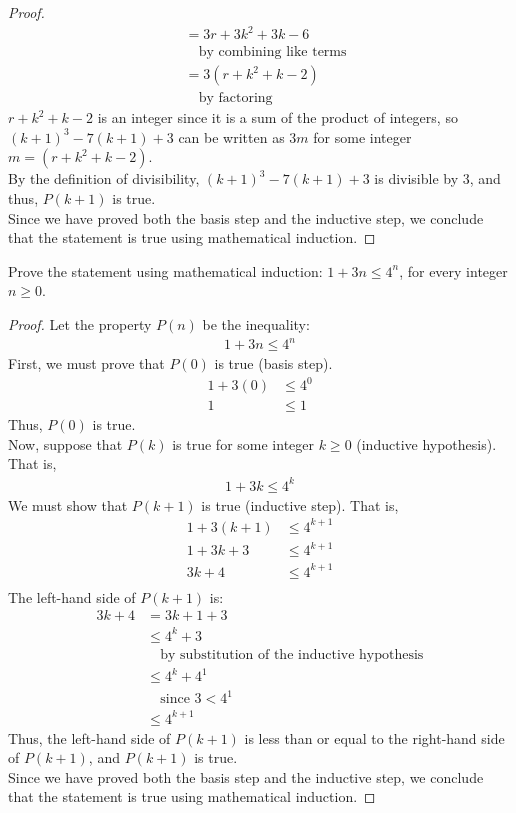 \documentclass[name=Ojas\ Chaturvedi, emailid=oj.chaturvedi.2024, course=Capstone:\ Discrete\ Math, num=8, deadline={November\ 2,\ 2023}]{homework}
\begin{document}
\begin{proof}
\begin{align*}
        &= 3r + 3k^2 + 3k - 6 \\
        & \quad \text{by combining like terms} \\
        &= 3(r + k^2 + k - 2) \\
        & \quad \text{by factoring}
    \end{align*}
    $r + k^2 + k - 2$ is an integer since it is a sum of the product of integers, so $(k+1)^3 -7(k+1) +3$ can be written as $3m$ for some integer $m = (r + k^2 + k - 2)$. \\
    By the definition of divisibility, $(k+1)^3 -7(k+1) +3$ is divisible by $3$, and thus, $P(k+1)$ is true. \\
    Since we have proved both the basis step and the inductive step, we conclude that the statement is true using mathematical induction.
\end{proof}

Prove the statement using mathematical induction: $1 + 3n \leq 4^n$, for every integer $n \geq 0$.
\begin{proof}
    Let the property $P(n)$ be the inequality:
    \begin{align*}
        1 + 3n \leq 4^n
    \end{align*}
    First, we must prove that $P(0)$ is true (basis step).
    \begin{align*}
        1 + 3(0) &\leq 4^0 \\
        1 &\leq 1
    \end{align*}
    Thus, $P(0)$ is true. \\
    Now, suppose that $P(k)$ is true for some integer $k \geq 0$ (inductive hypothesis). That is,
    \begin{align*}
        1 + 3k \leq 4^k
    \end{align*}
    We must show that $P(k+1)$ is true (inductive step). That is,
    \begin{align*}
        1 + 3(k+1) &\leq 4^{k+1} \\
        1 + 3k+3 &\leq 4^{k+1} \\
        3k+4 &\leq 4^{k+1} \\
    \end{align*}
    The left-hand side of $P(k+1)$ is:
    \begin{align*}
        3k+4 &= 3k+1+3 \\
        &\leq 4^k + 3 \\
        & \quad \text{by substitution of the inductive hypothesis} \\
        &\leq 4^k + 4^1 \\
        & \quad \text{since $3 < 4^1$} \\
        &\leq 4^{k+1}
    \end{align*}
    Thus, the left-hand side of $P(k+1)$ is less than or equal to the right-hand side of $P(k+1)$, and $P(k+1)$ is true. \\
    Since we have proved both the basis step and the inductive step, we conclude that the statement is true using mathematical induction.
\end{proof}
\end{document}
